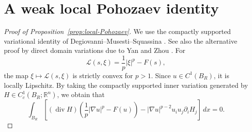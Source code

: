 \documentclass[reqno,12pt]{amsart}
\numberwithin{equation}{section}
\theoremstyle{remark}
\newcommand{\dd}{\,d}
\begin{document}
\appendix
\section{A weak local Pohozaev identity}

\begin{proof}[Proof of Proposition~\ref{prop:local-Pohozaev}]
We use the compactly supported variational identity of
Degiovanni--Musesti--Squassina
\cite[Lemma~1, formula~(3)]{DMS2003}. See also the alternative proof by
direct domain variations due to Yan and Zhou
\cite[Theorem~1.1]{YZ2026}. For
$$
\mathcal L(s,\xi)=\frac1p|\xi|^p-F(s),
$$
the map $\xi\mapsto\mathcal L(s,\xi)$ is strictly convex for $p>1$.
Since $u\in C^1(B_R)$, it is locally Lipschitz. By taking the compactly supported inner variation generated by $H\in C_c^1(B_R;\mathbb R^n)$, we obtain that
\begin{equation}\label{eq:local-PS-identity}
\int_{B_R} \left[(\operatorname{div}H)
\left(\frac1p|\nabla u|^p-F(u)\right)
-|\nabla u|^{p-2}u_i u_j\partial_iH_j
\right]\dd x=0.
\end{equation}


\end{proof}
\end{document}
